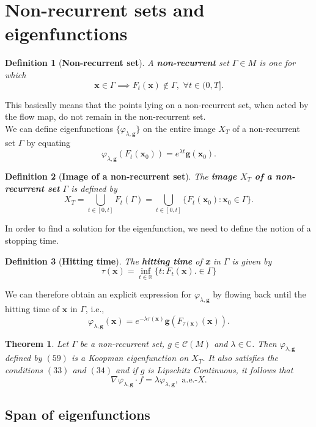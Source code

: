 \documentclass[]{article}
\newtheorem{definition}{Definition}
\newtheorem{theorem}{Theorem}
\begin{document}
\section{Non-recurrent sets and eigenfunctions}
\begin{definition}[\textbf{Non-recurrent set}]
A \textbf{non-recurrent} set $\Gamma \in M$ is one for which
\begin{equation}
	\textbf{x} \in \Gamma \implies F_t(\textbf{x}) \notin \Gamma, \,\, \forall t \in (0,T].
\end{equation}
\end{definition}
This basically means that the points lying on a non-recurrent set, when acted by the flow map, do not remain in the non-recurrent set. \\
We can define eigenfunctions $\{\varphi_{\lambda, \textbf{g}}\}$ on the entire image $X_T$ of a non-recurrent set $\Gamma$ by equating
\begin{equation}
	\varphi_{\lambda, \textbf{g}} (F_t(\textbf{x}_0)) = e^{\lambda t}\textbf{g}(\textbf{x}_0).
\end{equation}
\begin{definition}[\textbf{Image of a non-recurrent set}]
The \textbf{image $X_T$ of a non-recurrent set} $\Gamma$ is defined by
\begin{equation}
	X_T = \bigcup_{t \in [0,t]} F_t(\Gamma) = \bigcup_{t \in [0,t]} \{F_t(\textbf{x}_0): \textbf{x}_0 \in \Gamma\}.
\end{equation}
\end{definition}
In order to find a solution for the eigenfunction, we need to define the notion of a stopping time.
\begin{definition}[\textbf{Hitting time}]
The \textbf{hitting time} of \textbf{x} in $\Gamma$ is given by
\begin{equation}
	\tau(\textbf{x}) = \inf_{t \in \mathbb{R}} \{t:F_t(\textbf{x}). \in \Gamma\}
\end{equation}
\end{definition}
We can therefore obtain an explicit expression for $\varphi_{\lambda, \textbf{g}}$ by flowing back until the hitting time of $\textbf{x}$ in $\Gamma$, i.e.,
\begin{equation}
	\varphi_{\lambda, \textbf{g}}(\textbf{x}) = e^{-\lambda \tau(\textbf{x})} \textbf{g}(F_{\tau(\textbf{x})}(\textbf{x})).
\end{equation}
\begin{theorem}
Let $\Gamma$ be a non-recurrent set, $g \in \mathcal{C}(M)$ and $\lambda \in \mathbb{C}$. Then $\varphi_{\lambda, \textbf{g}}$ defined by $(59)$ is a Koopman eigenfunction on $X_T$. It also satisfies the conditions $(33)$ and $(34)$ and if $g$ is Lipschitz Continuous, it follows that 
\begin{equation}
	\nabla \varphi_{\lambda, \textbf{g}} \cdot f = \lambda \varphi_{\lambda, \textbf{g}}, \,\, \text{a.e.-$X$}.
\end{equation}
\end{theorem}
\subsection{Span of eigenfunctions}
\end{document}
